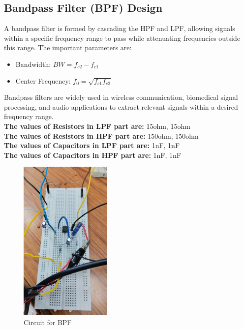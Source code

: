 \documentclass[a4paper,12pt]{article}
\begin{document}
\subsection{Bandpass Filter (BPF) Design}
A bandpass filter is formed by cascading the HPF and LPF, allowing signals within a specific frequency range to pass while attenuating frequencies outside this range. The important parameters are:
\begin{itemize}
    \item Bandwidth: $BW = f_{c2} - f_{c1}$
    \item Center Frequency: $f_0 = \sqrt{f_{c1} f_{c2}}$
\end{itemize}
Bandpass filters are widely used in wireless communication, biomedical signal processing, and audio applications to extract relevant signals within a desired frequency range.\\
\textbf{The values of Resistors in LPF part are:} 15ohm, 15ohm\\
\textbf{The values of Resistors in HPF part are:} 150ohm, 150ohm \\
\textbf{The values of Capacitors in LPF part are:} 1nF, 1nF \\
\textbf{The values of Capacitors in HPF part are:} 1nF, 1nF \\
\begin{figure}[H]
    \centering
    \includegraphics[width=0.4\textwidth]{figs/bpf_circuit.jpeg}
    \caption{Circuit for BPF}
\end{figure}
\end{document}
